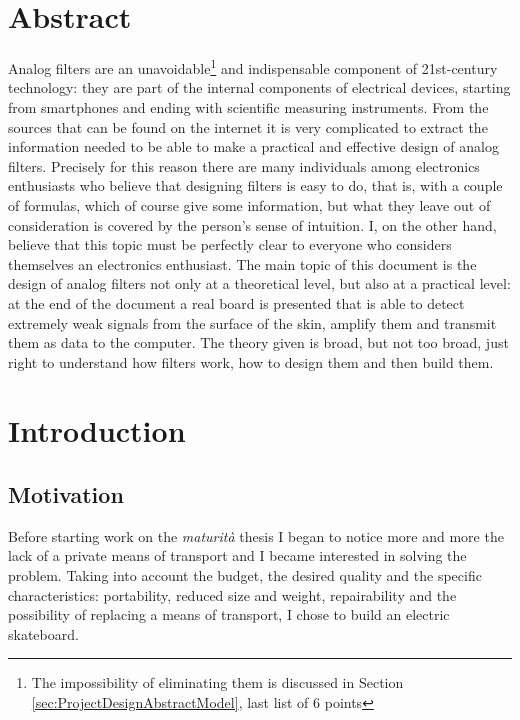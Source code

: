 \documentclass[a4paper, 10pt, final]{article} %
\begin{document}
    \section*{Abstract}
    \par Analog filters are an unavoidable\footnote{The impossibility of eliminating them is discussed in Section \ref{sec:ProjectDesignAbstractModel}, last list of 6 points} and indispensable component of 21st-century technology: they are part of the internal components of electrical devices, starting from smartphones and ending with scientific measuring instruments.
    From the sources that can be found on the internet it is very complicated to extract the information needed to be able to make a practical and effective design of analog filters.
    Precisely for this reason there are many individuals among electronics enthusiasts who believe that designing filters is easy to do, that is, with a couple of formulas, which of course give some information, but what they leave out of consideration is covered by the person's sense of intuition.
    I, on the other hand, believe that this topic must be perfectly clear to everyone who considers themselves an electronics enthusiast.
    The main topic of this document is the design of analog filters not only at a theoretical level, but also at a practical level: at the end of the document a real board is presented that is able to detect extremely weak signals from the surface of the skin, amplify them and transmit them as data to the computer.
    The theory given is broad, but not too broad, just right to understand how filters work, how to design them and then build them.
    \clearpage
    \tableofcontents

    \clearpage
    \section{Introduction}\label{sec:Intro}
    \subsection{Motivation}\label{sec:IntroMotivation}
    Before starting work on the \emph{maturit\`{a}} thesis I began to notice more and more the lack of a private means of transport and I became interested in solving the problem.
    Taking into account the budget, the desired quality and the specific characteristics: portability, reduced size and weight, repairability and the possibility of replacing a means of transport, I chose to build an electric skateboard.
    
\end{document}
